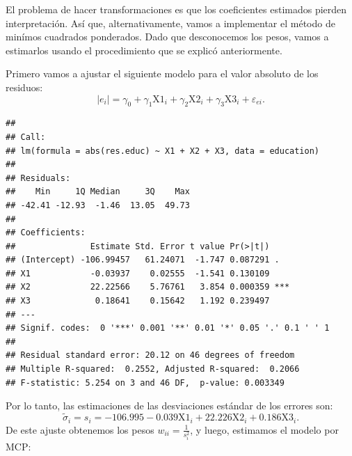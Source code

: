 \documentclass[
]{article}
\newenvironment{Shaded}{\begin{snugshade}}{\end{snugshade}}
\newcommand{\AttributeTok}[1]{\textcolor[rgb]{0.13,0.29,0.53}{#1}}
\newcommand{\DecValTok}[1]{\textcolor[rgb]{0.00,0.00,0.81}{#1}}
\newcommand{\FunctionTok}[1]{\textcolor[rgb]{0.13,0.29,0.53}{\textbf{#1}}}
\newcommand{\NormalTok}[1]{#1}
\newcommand{\OtherTok}[1]{\textcolor[rgb]{0.56,0.35,0.01}{#1}}
\newcommand{\SpecialCharTok}[1]{\textcolor[rgb]{0.81,0.36,0.00}{\textbf{#1}}}
\begin{document}
El problema de hacer transformaciones es que los coeficientes estimados pierden interpretación. Así que, alternativamente, vamos a implementar el método de minímos cuadrados ponderados. Dado que desconocemos los pesos, vamos a estimarlos usando el procedimiento que se explicó anteriormente.

Primero vamos a ajustar el siguiente modelo para el valor absoluto de los residuos:
\[
|e_{i}| = \gamma_{0} + \gamma_{1}\mbox{X1}_{i}+ \gamma_{2}\mbox{X2}_{i} + \gamma_{3}\mbox{X3}_{i} + \varepsilon_{ei}.
\]

\begin{Shaded}
\end{Shaded}

\begin{verbatim}
## 
## Call:
## lm(formula = abs(res.educ) ~ X1 + X2 + X3, data = education)
## 
## Residuals:
##    Min     1Q Median     3Q    Max 
## -42.41 -12.93  -1.46  13.05  49.73 
## 
## Coefficients:
##               Estimate Std. Error t value Pr(>|t|)    
## (Intercept) -106.99457   61.24071  -1.747 0.087291 .  
## X1            -0.03937    0.02555  -1.541 0.130109    
## X2            22.22566    5.76761   3.854 0.000359 ***
## X3             0.18641    0.15642   1.192 0.239497    
## ---
## Signif. codes:  0 '***' 0.001 '**' 0.01 '*' 0.05 '.' 0.1 ' ' 1
## 
## Residual standard error: 20.12 on 46 degrees of freedom
## Multiple R-squared:  0.2552, Adjusted R-squared:  0.2066 
## F-statistic: 5.254 on 3 and 46 DF,  p-value: 0.003349
\end{verbatim}

Por lo tanto, las estimaciones de las desviaciones estándar de los errores son:
\[
\widetilde{\sigma}_{i} = s_{i} = -106.995  -0.039\mbox{X1}_{i} + 22.226\mbox{X2}_{i} + 0.186\mbox{X3}_{i}.
\]
De este ajuste obtenemos los pesos \(w_{ii} = \frac{1}{s_{i}^{2}}\), y luego, estimamos el modelo por MCP:

\begin{Shaded}
\end{Shaded}
\end{document}
